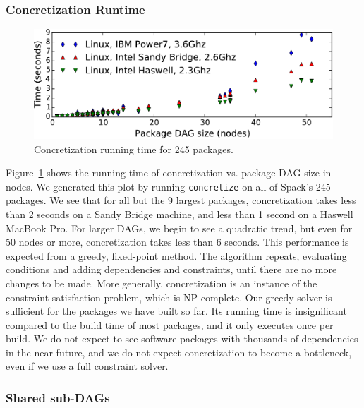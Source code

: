 \subsubsection{Concretization Runtime}
\label{sec:concretization-overhead}

\begin{figure}
	\centering
	\includegraphics[width=\columnwidth]{figs/concretization-overhead/concretization-times.pdf}
	\caption{
		Concretization running time for 245 packages.
		\label{fig:concretization-time}
	}
\end{figure}

Figure~\ref{fig:concretization-time} shows the running time of concretization vs.
package DAG size in nodes.  We generated this plot by running {\tt concretize}
on all of Spack's 245 packages.  We see that for all but the 9 largest
packages, concretization takes less than 2 seconds on a Sandy Bridge machine, 
and less than 1 second on a Haswell MacBook Pro.  For larger DAGs, we begin
to see a quadratic trend, but even for 50 nodes or more, concretization
takes less than 6 seconds.
%
This performance is expected from a greedy, fixed-point method.
The algorithm repeats, evaluating conditions and adding dependencies and constraints, until
there are no more changes to be made.
%
%
More generally, concretization is an instance of the constraint
satisfaction problem, which is NP-complete. Our greedy solver is sufficient for the
packages we have built so far.  Its running time is insignificant
compared to the build time of most packages, and it only executes
once per build.
We do not expect to see software packages with thousands of dependencies in the near
future, and we do not expect concretization to become a bottleneck, even if we
use a full constraint solver.

\subsubsection{Shared sub-DAGs}
\label{sec:directory-layout}

